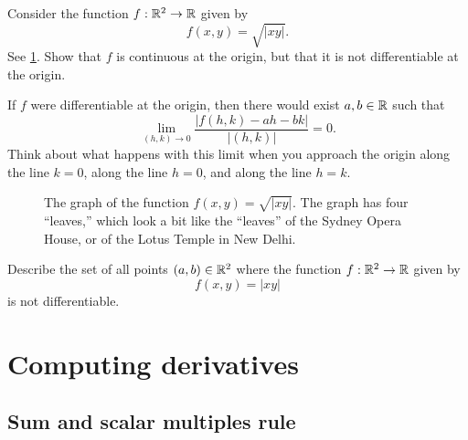 \begin{exercise} \label{continuous-not-differentiable}
	Consider the function $f : \mathbb{R}^2 \to \mathbb{R}$ given by \[ f(x,y) = \sqrt{|xy|}. \]
	See \cref{sqrt-x-y-graph}. Show that $f$ is continuous at the origin, but that it is not differentiable at the origin. 
	\begin{hint}
		If $f$ were differentiable at the origin, then there would exist $a, b \in \mathbb{R}$ such that 
		\[ \lim_{(h,k) \to 0} \frac{|f(h,k) - ah -  bk|}{|(h,k)|} = 0. \]
		Think about what happens with this limit when you approach the origin along the line $k = 0$, along the line $h = 0$, and along the line $h = k$.
	\end{hint}
	\begin{figure}[ht]
		\begin{center}
		\end{center}
		\caption{The graph of the function  $f(x,y) = \sqrt{|xy|}$. The graph has four ``leaves,'' which look a bit like the ``leaves'' of the Sydney Opera House, or of the Lotus Temple in New Delhi.} \label{sqrt-x-y-graph}
	\end{figure}
\end{exercise}

\begin{exercise} \label{differentiable-at-a-point-but-not-in-any-neighborhood}
	Describe the set of all points $(a, b) \in \mathbb{R}^2$ where the function $f : \mathbb{R}^2 \to \mathbb{R}$ given by \[ f(x,y) = |xy| \] is not differentiable. 
\end{exercise}

\section{Computing derivatives}

\subsection{Sum and scalar multiples rule} 


